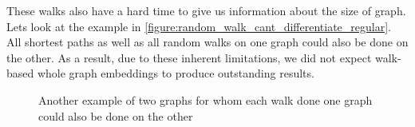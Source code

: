 These walks also have a hard time to give us information about the size of graph. Lets look at the example in \autoref{figure:random_walk_cant_differentiate_regular}. All shortest paths as well as all random walks on one graph could also be done on the other. As a result, due to these inherent limitations, we did not expect walk-based whole graph embeddings to produce outstanding results.

\begin{figure}[ht!]
    \begin{minipage}{\linewidth}
        \begin{minipage}{.5\linewidth}
            \centering
        \end{minipage}%
        \begin{minipage}{.5\linewidth}
            \centering

        \end{minipage}%
    \end{minipage}
    \caption[short]{Another example of two graphs for whom each walk done one graph could also be done on the other}
    \label{figure:random_walk_cant_differentiate_regular}
\end{figure}



